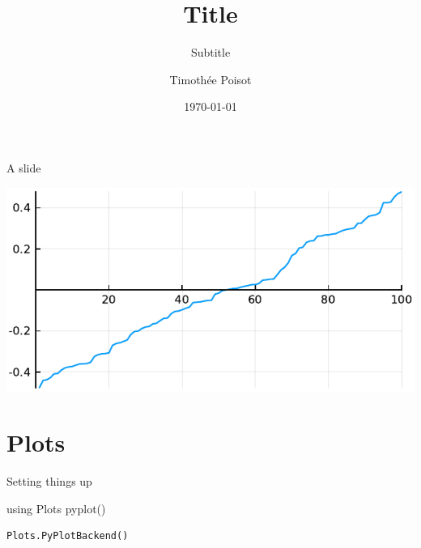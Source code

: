 \documentclass[11pt, compress, aspectratio=1610, serif]{beamer}
\title{Title}
\subtitle{Subtitle}
\date{\today}
\author{Timothée Poisot}
\institute{Université de Montréal}
\newenvironment{Shaded}{}{}
\newcommand{\NormalTok}[1]{{#1}}
\begin{document}
\maketitle

\begin{frame}{A slide}

\includegraphics[height=\textheight]{figures/density.pdf}

\end{frame}

\section{Plots}\label{plots}

\begin{frame}[fragile]{Setting things up}

\begin{Shaded}
\begin{Highlighting}[]
\NormalTok{using Plots}
\NormalTok{pyplot()}
\end{Highlighting}
\end{Shaded}

\begin{verbatim}
Plots.PyPlotBackend()
\end{verbatim}

\end{frame}
\end{document}
